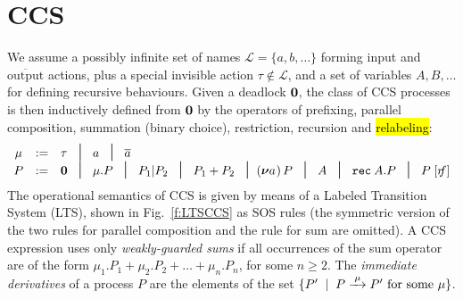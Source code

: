 
\section{CCS}
\label{ss:ccs}

We assume  a possibly infinite set of names $\mathscr{L} = \{a, b,
\ldots\}$ forming input and $\overline{\mbox{output}}$ actions, plus a special invisible
action $\tau \notin \mathscr{L}$, and a set of variables $A,B,
\ldots$ for defining recursive behaviours.
Given a deadlock ${\boldsymbol 0}$, the class of CCS processes is then inductively defined from ${\boldsymbol 0}$ by the operators
of prefixing, parallel composition, summation (binary choice), restriction, recursion and \hl{relabeling}:
\begin{equation*}
\begin{array}{ccl}
\mu  & := &  \tau \hspace{.3pt} \; \midd \; a  \; \midd \;  \outC a  \\
P  & := &  \nil \; \midd \;  \mu . P \; \midd \;  P_1 |  P_2 \; \midd  \;
P_1 + P_2 \; \midd %
  (\res a\!)\, P  \;  \midd \;  A \; \midd \; \recu A  P
\; \midd \; P\; [r\!\!f]  %
\end{array}
\end{equation*}
The operational semantics of CCS is given by means of
a Labeled Transition System (LTS), shown in Fig.~\ref{f:LTSCCS} as SOS
rules (the symmetric version of the two rules for
parallel composition and the rule for sum are omitted).
A CCS expression uses only \emph{weakly-guarded sums} if all occurrences of
the sum operator are of the form $\mu_1.P_1 + \mu_2.P_2 + \ldots
+ \mu_n.P_n$, for some $n \geq 2$.
 The \emph{immediate derivatives} of a
process $P$ are the elements of the set $\{P' \st P \arr\mu P' \mbox{
  for some $\mu$}\}$.
